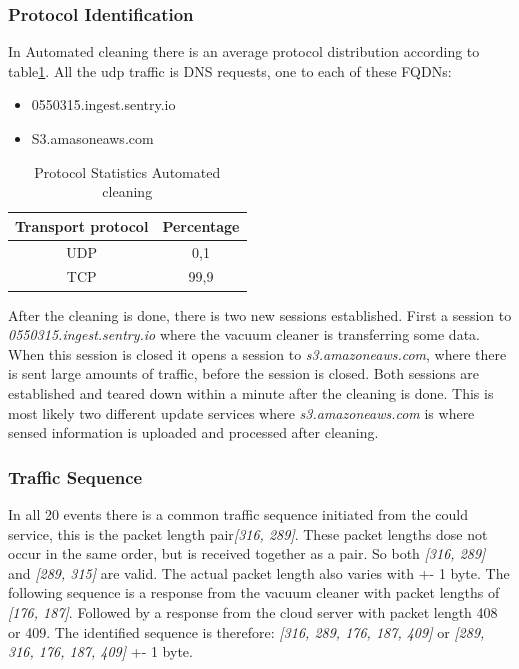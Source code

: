 \subsubsection{Protocol Identification}
In Automated cleaning there is an average protocol distribution according to table\ref{tab:acanalysisdist}. All the udp traffic is DNS requests, one to each of these FQDNs:

\begin{itemize}
    \item 0550315.ingest.sentry.io
    \item S3.amasoneaws.com
\end{itemize}

\begin{table}[H]
\centering
\caption{Protocol Statistics Automated cleaning}
\label{tab:acanalysisdist}
\begin{tabular}{|c|c|}
\hline
\textbf{Transport protocol} & \textbf{Percentage} \\ \hline
UDP                         & 0,1                 \\ \hline
TCP                         & 99,9                \\ \hline
\end{tabular}
\end{table}

After the cleaning is done, there is two new sessions established. First a session to \textit{0550315.ingest.sentry.io} where the vacuum cleaner is transferring some data. When this session is closed it opens a session to \textit{s3.amazoneaws.com}, where there is sent large amounts of traffic, before the session is closed. Both sessions are established and teared down within a minute after the cleaning is done. This is most likely two different update services where \textit{s3.amazoneaws.com} is where sensed information is uploaded and processed after cleaning.

\subsubsection{Traffic Sequence}
In all 20 events there is a common traffic sequence initiated from the could service, this is the packet length pair\textit{[316, 289]}. These packet lengths dose not occur in the same order, but is received together as a pair. So both \textit{[316, 289]} and \textit{[289, 315]} are valid. The actual packet length also varies with +- 1 byte. 
The following sequence is a response from the vacuum cleaner with packet lengths of \textit{[176, 187]}. Followed by a response from the cloud server with packet length 408 or 409. The identified sequence is therefore: \textit{[316, 289, 176, 187, 409]} or \textit{[289, 316, 176, 187, 409]} +- 1 byte.

